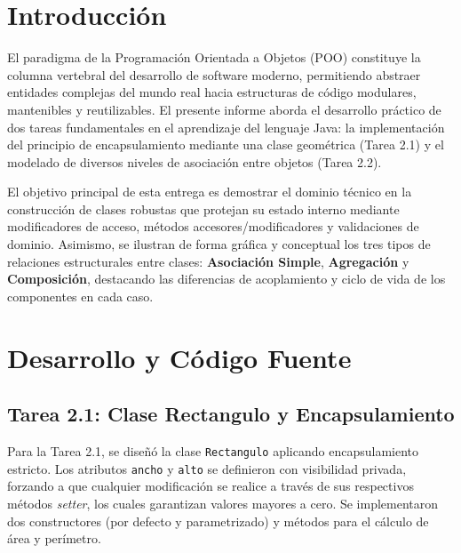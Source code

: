 \documentclass[12pt,a4paper]{article}
\begin{document}
\tableofcontents

\newpage


\section{Introducción}

El paradigma de la Programación Orientada a Objetos (POO) constituye la columna vertebral del desarrollo de software moderno, permitiendo abstraer entidades complejas del mundo real hacia estructuras de código modulares, mantenibles y reutilizables. El presente informe aborda el desarrollo práctico de dos tareas fundamentales en el aprendizaje del lenguaje Java: la implementación del principio de encapsulamiento mediante una clase geométrica (Tarea 2.1) y el modelado de diversos niveles de asociación entre objetos (Tarea 2.2).

El objetivo principal de esta entrega es demostrar el dominio técnico en la construcción de clases robustas que protejan su estado interno mediante modificadores de acceso, métodos accesores/modificadores y validaciones de dominio. Asimismo, se ilustran de forma gráfica y conceptual los tres tipos de relaciones estructurales entre clases: \textbf{Asociación Simple}, \textbf{Agregación} y \textbf{Composición}, destacando las diferencias de acoplamiento y ciclo de vida de los componentes en cada caso.

\section{Desarrollo y Código Fuente}

\subsection{Tarea 2.1: Clase Rectangulo y Encapsulamiento}

Para la Tarea 2.1, se diseñó la clase \texttt{Rectangulo} aplicando encapsulamiento estricto. Los atributos \texttt{ancho} y \texttt{alto} se definieron con visibilidad privada, forzando a que cualquier modificación se realice a través de sus respectivos métodos \emph{setter}, los cuales garantizan valores mayores a cero. Se implementaron dos constructores (por defecto y parametrizado) y métodos para el cálculo de área y perímetro.
\end{document}
